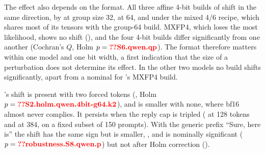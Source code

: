 The effect also depends on the format. All three affine 4-bit builds of \qwen{} shift in the same direction, by \pp{} at group size 32, \pp{} at 64, and \pp{} under the mixed 4/6 recipe, which shares most of its tensors with the group-64 build. MXFP4, which loses the most likelihood, shows no shift (\pp{}), and the four 4-bit builds differ significantly from one another (Cochran's $Q$, Holm $p=\N{S6.qwen.qp}$). The format therefore matters within one model and one bit width, a first indication that the size of a perturbation does not determine its effect. In the other two models no build shifts significantly, apart from a nominal \pp{} for \llama's MXFP4 build.

\qwen's shift is present with two forced tokens (\pp{}, Holm $p=\N{S2.holm.qwen.4bit-g64.k2}$), and is smaller with none, where bf16 almost never complies. It persists when the reply cap is tripled (\pp{} at 128 tokens and \pp{} at 384, on a fixed subset of 150 prompts). With the generic prefix ``Sure, here is'' the shift has the same sign but is smaller, \pp{} , and is nominally significant ($p=\N{robustness.S8.qwen.p}$) but not after Holm correction ().
